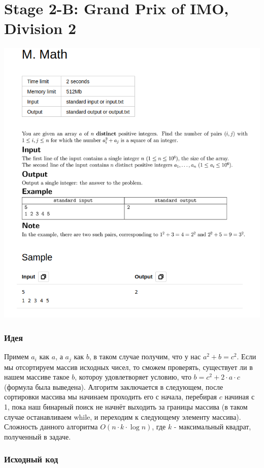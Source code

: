 \documentclass[12pt]{article}
\begin{document}
\pagebreak
\section{Stage 2-B: Grand Prix of IMO, Division 2}
\includegraphics[scale=0.75]{statements/2_M.png}
\subsubsection*{Идея}
Примем $a_i$ как $a$, а $a_j$ как $b$, в таком случае получим, что у нас $a^2 + b = c^2$.
Если мы отсортируем массив исходных чисел, то сможем проверять, существует ли в нашем массиве такое
$b$, котороу удовлетворяет условию, что $b = c^2 + 2 \cdot a \cdot c$ (формула была выведена). Алгоритм заключается в следующем,
после сортировки массива мы начинаем проходить его с начала, перебирая $c$ начиная с 1, пока наш бинарный поиск не начнёт выходить за границы
массива (в таком случае останавливаем while, и переходим к следующему элементу массива). 
\\ 
Сложность данного алгоритма $O(n \cdot k \cdot \log{n})$, где $k$ -
максимальный квадрат, полученный в задаче.
\subsubsection*{Исходный код}

\end{document}

